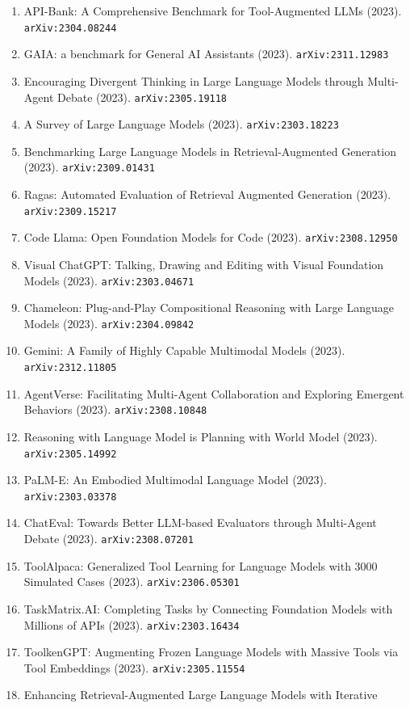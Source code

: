 \documentclass[11pt]{article}
\begin{document}
\begin{enumerate}
  \item API-Bank: A Comprehensive Benchmark for Tool-Augmented LLMs (2023). \texttt{arXiv:2304.08244}
  \item GAIA: a benchmark for General AI Assistants (2023). \texttt{arXiv:2311.12983}
  \item Encouraging Divergent Thinking in Large Language Models through
  Multi-Agent Debate (2023). \texttt{arXiv:2305.19118}
  \item A Survey of Large Language Models (2023). \texttt{arXiv:2303.18223}
  \item Benchmarking Large Language Models in Retrieval-Augmented Generation (2023). \texttt{arXiv:2309.01431}
  \item Ragas: Automated Evaluation of Retrieval Augmented Generation (2023). \texttt{arXiv:2309.15217}
  \item Code Llama: Open Foundation Models for Code (2023). \texttt{arXiv:2308.12950}
  \item Visual ChatGPT: Talking, Drawing and Editing with Visual Foundation
  Models (2023). \texttt{arXiv:2303.04671}
  \item Chameleon: Plug-and-Play Compositional Reasoning with Large Language
  Models (2023). \texttt{arXiv:2304.09842}
  \item Gemini: A Family of Highly Capable Multimodal Models (2023). \texttt{arXiv:2312.11805}
  \item AgentVerse: Facilitating Multi-Agent Collaboration and Exploring
  Emergent Behaviors (2023). \texttt{arXiv:2308.10848}
  \item Reasoning with Language Model is Planning with World Model (2023). \texttt{arXiv:2305.14992}
  \item PaLM-E: An Embodied Multimodal Language Model (2023). \texttt{arXiv:2303.03378}
  \item ChatEval: Towards Better LLM-based Evaluators through Multi-Agent Debate (2023). \texttt{arXiv:2308.07201}
  \item ToolAlpaca: Generalized Tool Learning for Language Models with 3000
  Simulated Cases (2023). \texttt{arXiv:2306.05301}
  \item TaskMatrix.AI: Completing Tasks by Connecting Foundation Models with
  Millions of APIs (2023). \texttt{arXiv:2303.16434}
  \item ToolkenGPT: Augmenting Frozen Language Models with Massive Tools via
  Tool Embeddings (2023). \texttt{arXiv:2305.11554}
  \item Enhancing Retrieval-Augmented Large Language Models with Iterative

\end{enumerate}
\end{document}
